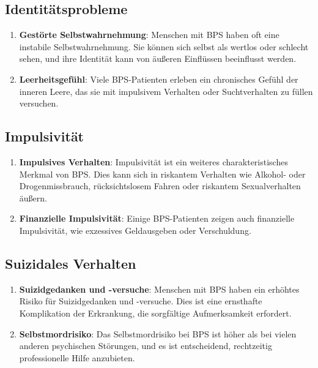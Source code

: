 \subsection{Identitätsprobleme}

\begin{enumerate}
\item \textbf{Gestörte Selbstwahrnehmung}: Menschen mit BPS haben oft eine instabile Selbstwahrnehmung. Sie können sich selbst als wertlos oder schlecht sehen, und ihre Identität kann von äußeren Einflüssen beeinflusst werden.

\item \textbf{Leerheitsgefühl}: Viele BPS-Patienten erleben ein chronisches Gefühl der inneren Leere, das sie mit impulsivem Verhalten oder Suchtverhalten zu füllen versuchen.
\end{enumerate}

\subsection{Impulsivität}

\begin{enumerate}
\item \textbf{Impulsives Verhalten}: Impulsivität ist ein weiteres charakteristisches Merkmal von BPS. Dies kann sich in riskantem Verhalten wie Alkohol- oder Drogenmissbrauch, rücksichtslosem Fahren oder riskantem Sexualverhalten äußern.

\item \textbf{Finanzielle Impulsivität}: Einige BPS-Patienten zeigen auch finanzielle Impulsivität, wie exzessives Geldausgeben oder Verschuldung.
\end{enumerate}

\subsection{Suizidales Verhalten}

\begin{enumerate}
\item \textbf{Suizidgedanken und -versuche}: Menschen mit BPS haben ein erhöhtes Risiko für Suizidgedanken und -versuche. Dies ist eine ernsthafte Komplikation der Erkrankung, die sorgfältige Aufmerksamkeit erfordert.

\item \textbf{Selbstmordrisiko}: Das Selbstmordrisiko bei BPS ist höher als bei vielen anderen psychischen Störungen, und es ist entscheidend, rechtzeitig professionelle Hilfe anzubieten.
\end{enumerate}

